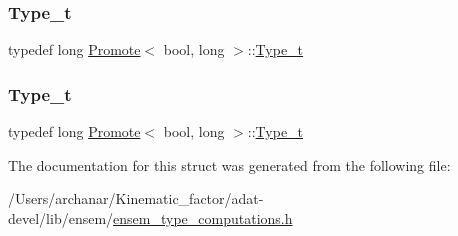 \subsubsection{\texorpdfstring{Type\_t}{Type\_t}\hspace{0.1cm}{\footnotesize\ttfamily [2/3]}}
{\footnotesize\ttfamily typedef long \mbox{\hyperlink{structPromote}{Promote}}$<$ bool, long $>$\+::\mbox{\hyperlink{structPromote_3_01bool_00_01long_01_4_acd7afc9445455e248d40955c9a61e0d3}{Type\+\_\+t}}}

\mbox{\label{structPromote_3_01bool_00_01long_01_4_acd7afc9445455e248d40955c9a61e0d3}} 
\subsubsection{\texorpdfstring{Type\_t}{Type\_t}\hspace{0.1cm}{\footnotesize\ttfamily [3/3]}}
{\footnotesize\ttfamily typedef long \mbox{\hyperlink{structPromote}{Promote}}$<$ bool, long $>$\+::\mbox{\hyperlink{structPromote_3_01bool_00_01long_01_4_acd7afc9445455e248d40955c9a61e0d3}{Type\+\_\+t}}}



The documentation for this struct was generated from the following file\+:\begin{DoxyCompactItemize}
\item 
/\+Users/archanar/\+Kinematic\+\_\+factor/adat-\/devel/lib/ensem/\mbox{\hyperlink{adat-devel_2lib_2ensem_2ensem__type__computations_8h}{ensem\+\_\+type\+\_\+computations.\+h}}\end{DoxyCompactItemize}

